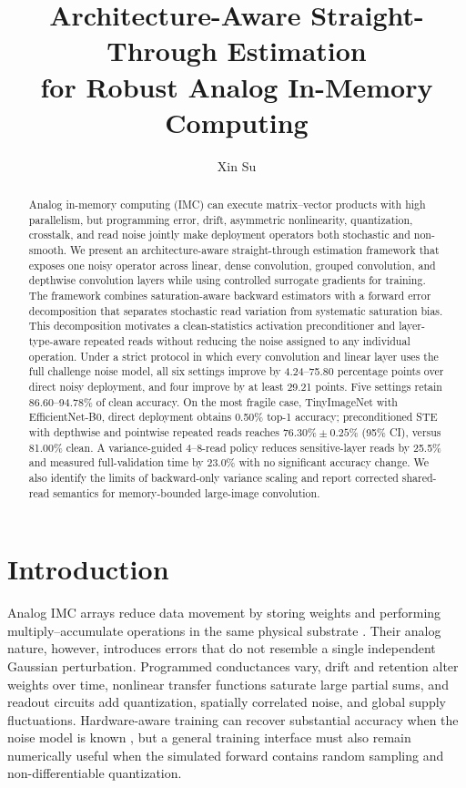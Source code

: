 \documentclass[10pt,twocolumn,letterpaper]{article}
\title{\vspace{-0.48in}\Large\bfseries
Architecture-Aware Straight-Through Estimation\\
for Robust Analog In-Memory Computing\vspace{-0.10in}}
\author{Xin Su}
\date{}
\begin{document}
\maketitle
\vspace{-0.38in}

\begin{abstract}
Analog in-memory computing (IMC) can execute matrix--vector products with high
parallelism, but programming error, drift, asymmetric nonlinearity,
quantization, crosstalk, and read noise jointly make deployment operators both
stochastic and non-smooth.  We present an architecture-aware straight-through
estimation framework that exposes one noisy operator across linear, dense
convolution, grouped convolution, and depthwise convolution layers while using
controlled surrogate gradients for training.  The framework combines
saturation-aware backward estimators with a forward error decomposition that
separates stochastic read variation from systematic saturation bias.  This
decomposition motivates a clean-statistics activation preconditioner and
layer-type-aware repeated reads without reducing the noise assigned to any
individual operation.  Under a strict protocol in which every convolution and
linear layer uses the full challenge noise model, all six settings improve by
4.24--75.80 percentage points over direct noisy deployment, and four improve by
at least 29.21 points.  Five settings retain 86.60--94.78\% of clean accuracy.
On the most fragile case, TinyImageNet with EfficientNet-B0, direct
deployment obtains 0.50\% top-1 accuracy; preconditioned STE with depthwise and
pointwise repeated reads reaches $76.30\%\mathbin{\pm}0.25\%$ (95\% CI), versus
81.00\% clean.  A variance-guided 4--8-read policy reduces sensitive-layer
reads by 25.5\% and measured full-validation time by 23.0\% with no significant
accuracy change.  We also identify the limits of backward-only variance
scaling and report corrected shared-read semantics for memory-bounded
large-image convolution.
\end{abstract}

\section{Introduction}
\label{sec:introduction}

Analog IMC arrays reduce data movement by storing weights and performing
multiply--accumulate operations in the same physical substrate
\citep{gokmen2016acceleration,legallo2018mixed,shafiee2016isaac}.  Their analog
nature, however, introduces errors that do not resemble a single independent
Gaussian perturbation.  Programmed conductances vary, drift and retention alter
weights over time, nonlinear transfer functions saturate large partial sums,
and readout circuits add quantization, spatially correlated noise, and global
supply fluctuations.  Hardware-aware training can recover substantial
accuracy when the noise model is known \citep{joshi2020accurate}, but a general
training interface must also remain numerically useful when the simulated
forward contains random sampling and non-differentiable quantization.
\end{document}

